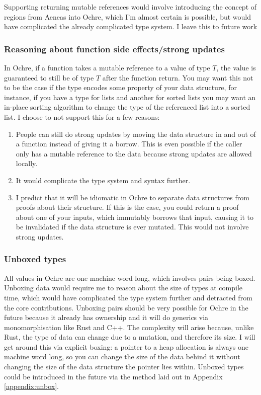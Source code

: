 \documentclass[12pt,twoside]{report}
\begin{document}
Supporting returning mutable references would involve introducing the concept of regions from Aeneas into Ochre, which I'm almost certain is possible, but would have complicated the already complicated type system. I leave this to future work 

\subsubsection{Reasoning about function side effects/strong updates}
In Ochre, if a function takes a mutable reference to a value of type $T$, the value is guaranteed to still be of type $T$ after the function return. You may want this not to be the case if the type encodes some property of your data structure, for instance, if you have a type for lists and another for sorted lists you may want an in-place sorting algorithm to change the type of the referenced list into a sorted list. I choose to not support this for a few reasons:
\begin{enumerate}
  \item People can still do strong updates by moving the data structure in and out of a function instead of giving it a borrow. This is even possible if the caller only has a mutable reference to the data because strong updates are allowed locally.
  \item It would complicate the type system and syntax further.
  \item I predict that it will be idiomatic in Ochre to separate data structures from proofs about their structure. If this is the case, you could return a proof about one of your inputs, which immutably borrows that input, causing it to be invalidated if the data structure is ever mutated. This would not involve strong updates.
\end{enumerate}

\subsubsection{Unboxed types}
All values in Ochre are one machine word long, which involves pairs being boxed. Unboxing data would require me to reason about the size of types at compile time, which would have complicated the type system further and detracted from the core contributions. Unboxing pairs should be very possible for Ochre in the future because it already has ownership and it will do generics via monomorphisation like Rust and C++. The complexity will arise because, unlike Rust, the type of data can change due to a mutation, and therefore its size. I will get around this via explicit boxing: a pointer to a heap allocation is always one machine word long, so you can change the size of the data behind it without changing the size of the data structure the pointer lies within. Unboxed types could be introduced in the future via the method laid out in Appendix \ref{appendix:unbox}.
\end{document}

